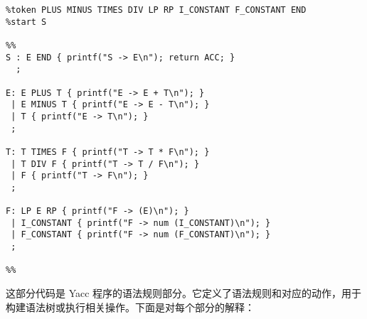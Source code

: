 \documentclass[lang=cn,11pt,a4paper]{elegantpaper}
\begin{document}
\begin{lstlisting}
%token PLUS MINUS TIMES DIV LP RP I_CONSTANT F_CONSTANT END
%start S

%%
S : E END { printf("S -> E\n"); return ACC; }
  ;

E: E PLUS T { printf("E -> E + T\n"); }
 | E MINUS T { printf("E -> E - T\n"); }
 | T { printf("E -> T\n"); }
 ;

T: T TIMES F { printf("T -> T * F\n"); }
 | T DIV F { printf("T -> T / F\n"); }
 | F { printf("T -> F\n"); }
 ;

F: LP E RP { printf("F -> (E)\n"); }
 | I_CONSTANT { printf("F -> num (I_CONSTANT)\n"); }
 | F_CONSTANT { printf("F -> num (F_CONSTANT)\n"); }
 ;

%%
\end{lstlisting}

这部分代码是 Yacc 程序的语法规则部分。它定义了语法规则和对应的动作，用于构建语法树或执行相关操作。下面是对每个部分的解释：
\end{document}
